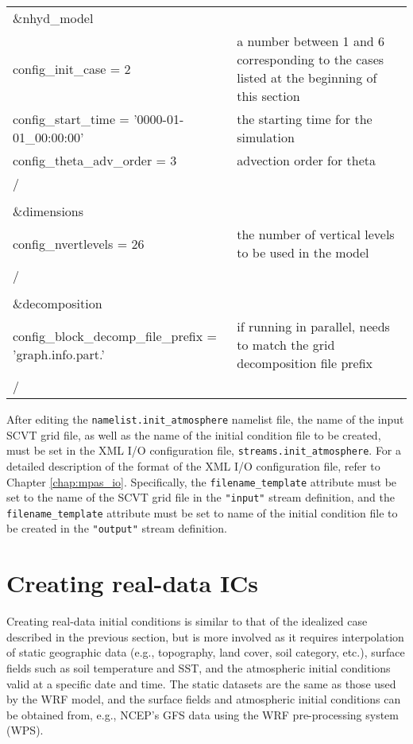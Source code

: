 \begin{longtable}{p{3in}|p{3.25in}}

\&nhyd\_model\\
   config\_init\_case = 2                      & a number between 1 and 6 corresponding to the cases listed at the beginning of this section\\
   config\_start\_time = '0000-01-01\_00:00:00' & the starting time for the simulation\\
   config\_theta\_adv\_order = 3                     & advection order for theta \\
/\\
\\
\&dimensions\\
   config\_nvertlevels = 26                      & the number of vertical levels to be used in the model \\
/\\
\\
\&decomposition\\
   config\_block\_decomp\_file\_prefix = 'graph.info.part.' & if running in parallel, needs to match the grid decomposition file prefix \\
/\\

\end{longtable}

After editing the {\tt namelist.init\_atmosphere} namelist file, the name of the input SCVT grid file, as well as the name of the initial condition file to be created, must be set in the XML I/O configuration file, {\tt streams.init\_atmosphere}. For a detailed description of the format of the XML I/O configuration file, refer to Chapter \ref{chap:mpas_io}. Specifically, the {\tt filename\_template} attribute must be set to the name of the SCVT grid file in the {\tt "input"} stream definition, and the {\tt filename\_template} attribute must be set to name of the initial condition file to be created in the {\tt "output"} stream definition.


\section{Creating real-data ICs}
\label{sec:atm_real_init}

Creating real-data initial conditions is similar to that of the idealized case described in the previous section, but is more involved as it requires interpolation of static geographic data (e.g., topography, land cover, soil category, etc.), surface fields such as soil temperature and SST, and the atmospheric initial conditions valid at a specific date and time. The static datasets are the same as those used by the WRF model, and the surface fields and atmospheric initial conditions can be obtained from, e.g., NCEP's GFS data using the WRF pre-processing system (WPS).

